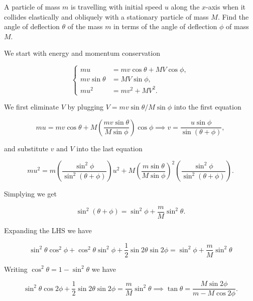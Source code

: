 \documentclass[a4paper,12pt]{report}
\begin{document}
{A particle of mass \(m\)  is travelling with initial speed \(u\)  along the \(x\)-axis when it collides elastically and obliquely with a stationary particle of mass \(M\). Find the angle of deflection \(\theta \) of the mass \(m\) in terms of the angle of deflection \(\phi \) of mass \(M\).}
{We start with energy and momentum conservation 

\begin{equation}
	\begin{cases}
		mu &= mv \cos \theta + MV \cos \phi ,\\
		mv \sin \theta &= MV \sin \phi ,\\
		mu ^2&=mv^2+MV^2.
	\end{cases}
\end{equation}

We first eliminate \(V\)  by plugging \(V = mv \sin \theta /M\sin \phi \) into the first equation

\begin{equation}
		mu = mv\cos \theta + M\left( \frac{mv\sin \theta }{M\sin \phi }  \right)\cos \phi \implies v = \frac{u \sin \phi }{\sin (\theta +\phi )},
\end{equation}

and substitute \(v \text { and } V\) into the last equation

\begin{equation}
	mu^2= m\left( \frac{\sin ^2\phi }{\sin ^2(\theta +\phi )}  \right)u^2+M\left( \frac{m\sin \theta }{M\sin \phi }  \right)^2\left( \frac{\sin ^2\phi }{\sin ^2(\theta +\phi )}  \right).
\end{equation}

Simplying we get 

\begin{equation}
	\sin ^2(\theta +\phi ) = \sin ^2\phi + \frac{m}{M} \sin ^2\theta .
\end{equation}

Expanding the LHS we have 

\begin{equation}
	\sin ^2\theta \cos ^2\phi +\cos ^2\theta \sin ^2\phi + \frac{1}{2} \sin 2\theta \sin 2\phi = \sin ^2\phi + \frac{m}{M} \sin ^2\theta 
\end{equation}

Writing \(\cos ^2\theta = 1-\sin ^2\theta \) we have 

\begin{equation}
	\sin ^2\theta \cos 2\phi + \frac{1}{2} \sin 2\theta \sin 2\phi = \frac{m}{M} \sin ^2\theta \implies \tan \theta = \frac{M\sin 2\phi }{m - M\cos 2\phi }. 
\end{equation}
~
} 
\end{document}
